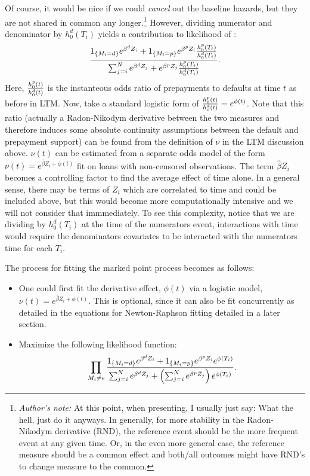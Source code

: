 \documentclass[10pt]{article}
\begin{document}
Of course, it would be nice if we could {\em cancel} out the baseline hazards, but they are not shared in common any longer.\footnote{{\em
Author's note:}  At this point, when presenting, I usually just say: What the hell, just do it anyways.  In generally, for more stability 
in the Radon-Nikodym derivative (RND), the reference event should be the more frequent event at any given time.  Or, in the even more general
case, the reference measure should be a common effect and both/all outcomes might have RND's to change measure to the common.}
However, dividing numerator and 
denominator by $h^d_0(T_i)$ yields a contribution to likelihood of :
$$ {{1_{\{M_i=d\}}e^{\beta^d Z_i}+1_{\{M_i=p\}}e^{\beta^p Z_i}{h^p_0(T_i)\over h^d_0(T_i)} } 
\over { \sum_{j=i}^N e^{\beta^d Z_j}+e^{\beta^p Z_j}{h^p_0(T_i)\over h^d_0(T_i)} } }.$$
Here, ${h^p_0(t)\over h^d_0(t)}$ is the instanteous odds ratio of prepayments to defaults at time $t$ as before in LTM.  Now, take a standard logistic form of 
${h^p_0(t)\over h^d_0(t)}={e^{\phi(t)}}$. Note that this ratio (actually a Radon-Nikodym derivative between the two measures and therefore induces some 
absolute continuity assumptions between the default and prepayment support) can be found from the definition of $\nu$ in the LTM discussion above.  
$\nu(t)$ can be estimated from a separate odds model of the form $\nu(t)=e^{\hat{\beta}Z_i+\phi(t)}$ fit on loans with non-censored observations.  The 
term ${\hat{\beta}Z_i}$ becomes a controlling factor to find the average effect of time alone.  In a general sense, there may be terms of $Z_i$ which are 
correlated to time and could be included above, but this would become more computationally intensive and we will not consider that immmediately. To see this 
complexity, notice that we are dividing by $h^d_0(T_i)$ at the time of the numerators event, interactions with time would require the denominators covariates
to be interacted with the numerators time for each $T_i$.  


The process for fitting the marked point process becomes as follows:
\begin{itemize}
    \item One could first fit the derivative effect, $\phi(t)$ via a logistic model, $\nu(t)=e^{\hat{\beta}Z_i+\phi(t)}$.  
        This is optional, since it can also be fit concurrently as detailed in the equations for Newton-Raphson fitting detailed in a later
        section.

\item Maximize the following likelihood function:
$$\prod_{M_i \not = e} {{1_{\{M_i=d\}}e^{\beta^d Z_i}+1_{\{M_i=p\}}e^{\beta^p Z_i}e^{\phi(T_i)} }
\over { \sum_{j=i}^N e^{\beta^d Z_j}+\left({\sum_{j=i}^N e^{\beta^p Z_j}}\right)e^{\phi(T_i)} } }. $$
\end{itemize}
\end{document}
